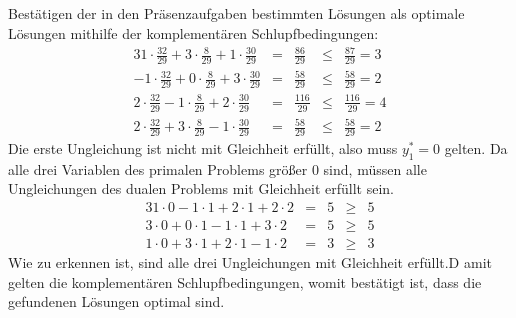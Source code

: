 \documentclass[10pt,a4paper,oneside,ngerman,numbers=noenddot]{scrartcl}
\begin{document}
	\subsection{} %
		Bestätigen der in den Präsenzaufgaben bestimmten Lösungen als optimale Lösungen mithilfe der komplementären Schlupfbedingungen:
		\begin{alignat*}{3}
			1 \cdot \frac{32}{29} + 3 \cdot \frac{8}{29} + 1 \cdot \frac{30}{29} &=& \frac{86}{29} &\leq & \frac{87}{29} = 3 \\
			-1 \cdot \frac{32}{29} + 0 \cdot \frac{8}{29} + 3 \cdot \frac{30}{29} &=& \frac{58}{29} &\leq & \frac{58}{29} = 2 \\
			2 \cdot \frac{32}{29} - 1 \cdot \frac{8}{29} + 2 \cdot \frac{30}{29} &=& \frac{116}{29} &\leq & \frac{116}{29} = 4 \\
			2 \cdot \frac{32}{29} + 3 \cdot \frac{8}{29} - 1 \cdot \frac{30}{29} &=& \frac{58}{29} &\leq & \frac{58}{29} = 2
		\end{alignat*}
		Die erste Ungleichung ist nicht mit Gleichheit erfüllt, also muss $y_{1}^{*} = 0$ gelten. Da alle drei Variablen des primalen Problems größer $0$ sind, müssen alle Ungleichungen des dualen Problems mit Gleichheit erfüllt sein.
		\begin{alignat*}{3}
			1 \cdot 0 - 1 \cdot 1 + 2 \cdot 1 + 2 \cdot 2 &=& 5 &\geq & 5 \\
			3 \cdot 0 + 0 \cdot 1 - 1 \cdot 1 + 3 \cdot 2 &=& 5 &\geq & 5 \\
			1 \cdot 0 + 3 \cdot 1 + 2 \cdot 1 - 1 \cdot 2 &=& 3 &\geq & 3
		\end{alignat*}
		Wie zu erkennen ist, sind alle drei Ungleichungen mit Gleichheit erfüllt.D amit gelten die komplementären Schlupfbedingungen, womit bestätigt ist, dass die gefundenen Lösungen optimal sind.
\end{document}
